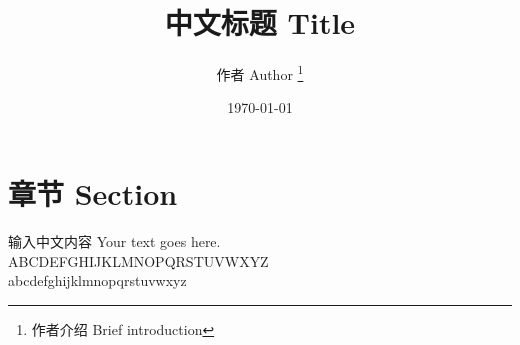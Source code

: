 \documentclass[UTF8,a4paper,10pt]{ctexart}
\title{中文标题 Title}
\author{ 作者 Author \thanks{作者介绍 Brief introduction} }
\date{\today}
\begin{document}
	\maketitle
\section{章节 Section}
	输入中文内容 Your text goes here. \\
	ABCDEFGHIJKLMNOPQRSTUVWXYZ \\
	abcdefghijklmnopqrstuvwxyz
\end{document}
